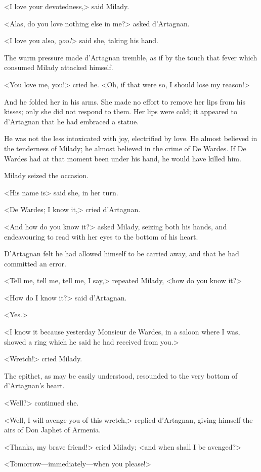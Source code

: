 <I love your devotedness,> said Milady. 

<Alas, do you love nothing else in me?> asked d'Artagnan. 

<I love you also, \textit{you!}> said she, taking his hand. 

The warm pressure made d'Artagnan tremble, as if by the touch that fever which consumed Milady attacked himself. 

<You love me, you!> cried he. <Oh, if that were so, I should lose my reason!> 

And he folded her in his arms. She made no effort to remove her lips from his kisses; only she did not respond to them. Her lips were cold; it appeared to d'Artagnan that he had embraced a statue. 

He was not the less intoxicated with joy, electrified by love. He almost believed in the tenderness of Milady; he almost believed in the crime of De Wardes. If De Wardes had at that moment been under his hand, he would have killed him. 

Milady seized the occasion. 

<His name is\longdash> said she, in her turn. 

<De Wardes; I know it,> cried d'Artagnan. 

<And how do you know it?> asked Milady, seizing both his hands, and endeavouring to read with her eyes to the bottom of his heart. 

D'Artagnan felt he had allowed himself to be carried away, and that he had committed an error. 

<Tell me, tell me, tell me, I say,> repeated Milady, <how do you know it?> 

<How do I know it?> said d'Artagnan. 

<Yes.> 

<I know it because yesterday Monsieur de Wardes, in a saloon where I was, showed a ring which he said he had received from you.> 

<Wretch!> cried Milady. 

The epithet, as may be easily understood, resounded to the very bottom of d'Artagnan's heart. 

<Well?> continued she. 

<Well, I will avenge you of this wretch,> replied d'Artagnan, giving himself the airs of Don Japhet of Armenia. 

<Thanks, my brave friend!> cried Milady; <and when shall I be avenged?> 

<Tomorrow---immediately---when you please!> 


